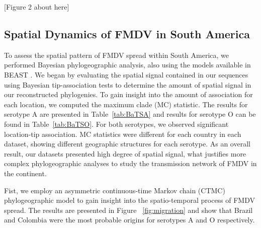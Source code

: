\documentclass[10pt]{article}
\begin{document}
\begin{center}
 [Figure 2 about here]
\end{center}


\subsection*{Spatial Dynamics of FMDV in South America}


To assess the spatial pattern of FMDV spread within South America, we performed Bayesian phylogeographic analysis, also using the models available in BEAST \cite{roots}.
We began by evaluating the spatial signal contained in our sequences using Bayesian tip-association tests \cite{bats} to determine the amount of spatial signal in our reconstructed phylogenies.
To gain insight into the amount of association for each location, we computed the maximum clade (MC) statistic.
The results for serotype A are presented in Table~\ref{tab:BaTSA} and results for serotype O can be found in Table~\ref{tab:BaTSO}.
For both serotypes, we observed significant location-tip association.
MC statistics were different for each country in each dataset, showing different geographic structures for each serotype.
As an overall result, our datasets presented high degree of spatial signal, what justifies more complex phylogeographic analyses to study the transmission network of FMDV in the continent.

Fist, we employ an asymmetric continuous-time Markov chain (CTMC) phylogeographic model \cite{roots} to gain insight into the spatio-temporal process of FMDV spread.
The results are presented in Figure ~\ref{fig:migration} and show that Brazil and Colombia were the most probable origins for serotypes A and O respectively.
\end{document}
